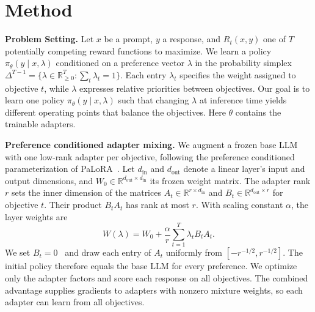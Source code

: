 \documentclass{article} %
\begin{document}
\section{Method}  

\textbf{Problem Setting.} Let $x$ be a prompt, $y$ a response, and $R_t(x,y)$ one of $T$ potentially competing reward functions to maximize. We learn a policy $\pi_\theta(y\mid x,\lambda)$ conditioned on a preference vector $\lambda$ in the probability simplex $\Delta^{T-1}=\{\lambda\in\mathbb R_{\geq0}^{T}:\sum_t\lambda_t=1\}$. Each entry $\lambda_t$ specifies the weight assigned to objective $t$, while $\lambda$ expresses relative priorities between objectives. Our goal is to learn one policy $\pi_\theta(y\mid x,\lambda)$ such that changing $\lambda$ at inference time yields different operating points that balance the objectives. Here $\theta$ contains the trainable adapters.

\textbf{Preference conditioned adapter mixing.}
We augment a frozen base LLM with one low-rank adapter per objective, following the preference conditioned parameterization of PaLoRA~\citep{dimitriadis2025palora}. Let $d_{\mathrm{in}}$ and $d_{\mathrm{out}}$ denote a linear layer's input and output dimensions, and $W_0\in\mathbb{R}^{d_{\mathrm{out}}\times d_{\mathrm{in}}}$ its frozen weight matrix. The adapter rank $r$ sets the inner dimension of the matrices $A_t\in\mathbb{R}^{r\times d_{\mathrm{in}}}$ and $B_t\in\mathbb{R}^{d_{\mathrm{out}}\times r}$ for objective $t$.  Their product $B_tA_t$ has rank at most $r$. With scaling constant $\alpha$, the layer weights are
\begin{equation}
W(\lambda)=W_0+\frac{\alpha}{r}\sum_{t=1}^{T}\lambda_t B_tA_t.
\label{eq:palora}
\end{equation}
We set $B_t=0$~\citep{hu2022lora} and draw each entry of $A_t$ uniformly from $[-r^{-1/2},r^{-1/2}]$.  The initial policy therefore equals the base LLM for every preference. We optimize only the adapter factors and score each response on all objectives. The combined advantage supplies gradients to adapters with nonzero mixture weights, so each adapter can learn from all objectives.
\end{document}
